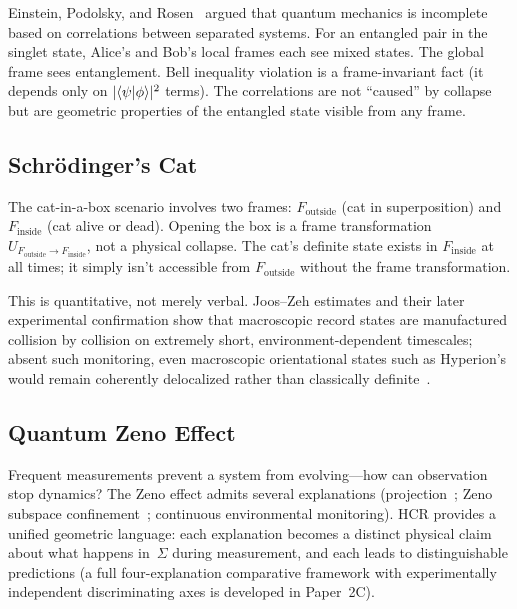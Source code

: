 \documentclass[aps,prd,twocolumn,superscriptaddress,nofootinbib,floatfix]{revtex4-2}
\newcommand{\Sig}{\Sigma}
\newcommand{\HCR}{HCR}
\newcommand{\CR}{\HCR}  %
\begin{document}
Einstein, Podolsky, and Rosen~\cite{einsteinCanQuantumMechanical1935} argued that quantum mechanics is incomplete based on correlations between separated systems. For an entangled pair in the singlet state, Alice's and Bob's local frames each see mixed states. The global frame sees entanglement. Bell inequality violation is a frame-invariant fact (it depends only on $|\!\braket{\psi|\phi}\!|^2$ terms). The correlations are not ``caused'' by collapse but are geometric properties of the entangled state visible from any frame.

\subsection{Schr\"odinger's Cat}

The cat-in-a-box scenario involves two frames: $F_{\mathrm{outside}}$ (cat in superposition) and $F_{\mathrm{inside}}$ (cat alive or dead). Opening the box is a frame transformation $U_{F_{\mathrm{outside}} \to F_{\mathrm{inside}}}$, not a physical collapse. The cat's definite state exists in $F_{\mathrm{inside}}$ at all times; it simply isn't accessible from $F_{\mathrm{outside}}$ without the frame transformation.

This is quantitative, not merely verbal. Joos--Zeh estimates and their later experimental confirmation show that macroscopic record states are manufactured collision by collision on extremely short, environment-dependent timescales; absent such monitoring, even macroscopic orientational states such as Hyperion's would remain coherently delocalized rather than classically definite~\cite{JoosZeh1985,joosDecoherenceAppearanceClassical2003,Haroche1996decoherence}.

\subsection{Quantum Zeno Effect}

Frequent measurements prevent a system from evolving---how can observation stop dynamics? The Zeno effect admits several explanations (projection~\cite{MisraSudarshan1977}; Zeno subspace confinement~\cite{FacchiPascazio2002}; continuous environmental monitoring). \CR{} provides a unified geometric language: each explanation becomes a distinct physical claim about what happens in~$\Sig$ during measurement, and each leads to distinguishable predictions (a full four-explanation comparative framework with experimentally independent discriminating axes is developed in Paper~2C).
\end{document}

